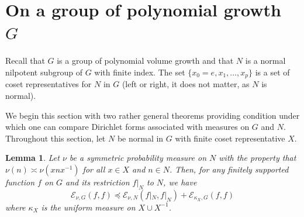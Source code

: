 \documentclass[pdflatex,sn-mathphys-num]{sn-jnl}%
\theoremstyle{thmstyleone}%
\theoremstyle{thmstyletwo}%
\theoremstyle{thmstylethree}%
\newtheorem{lem}{Lemma}%
\begin{document}
\section{On a group of polynomial growth $
G$}
Recall that $G$ is a group of polynomial volume growth and that $N$ is a normal nilpotent subgroup of $G$ with finite index. The set
$\{x_0=e,x_1,\dots,x_p\}$ is a set of coset representatives for $N$ in $G$ (left or right, it does not matter, as $N$ is normal).



We begin this section with two rather general theorems providing condition under which one can  compare Dirichlet forms associated with measures on $G$ and $N$. Throughout this section, let $N$ be normal in $G$ with finite coset representative $X$.
\begin{lem}
\label{lem: Dirichlet-decomp} 
Let  $\nu$ be a symmetric probability measure on $N$ with the property that $\nu(n) \asymp \nu(xnx^{-1})$ for all $x\in X$ and $n\in N$.  
Then, for any finitely supported function $f$ on $G$ and its restriction $\left. f\right|_N$ to $N$, we have  
$$\mathcal{E}_{\nu, G}(f,f)\preccurlyeq  \mathcal{E}_{\nu, N}(f|_N,f|_N) + \mathcal{E}_{\kappa_X, G}(f,f)$$
where $\kappa_X$ is the uniform measure on $X\cup X^{-1}$. 
\end{lem}
\end{document}
